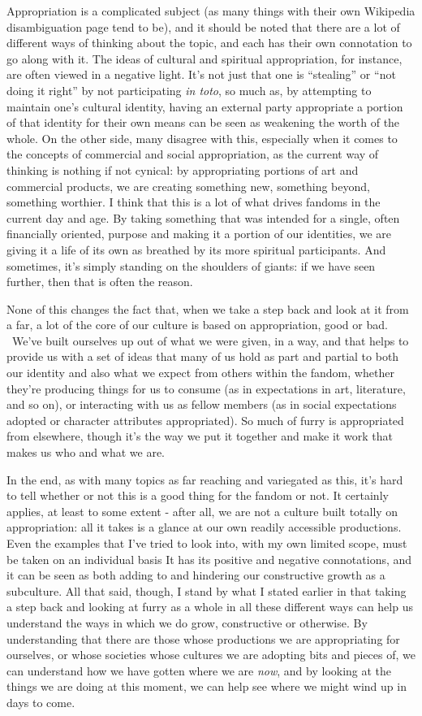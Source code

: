 Appropriation is a complicated subject (as many things with their own
Wikipedia disambiguation page tend to be), and it should be noted that
there are a lot of different ways of thinking about the topic, and each
has their own connotation to go along with it. The ideas of cultural and
spiritual appropriation, for instance, are often viewed in a negative
light. It's not just that one is ``stealing'' or ``not doing it right''
by not participating \emph{in toto}, so much as, by attempting to
maintain one's cultural identity, having an external party appropriate a
portion of that identity for their own means can be seen as weakening
the worth of the whole. On the other side, many disagree with this,
especially when it comes to the concepts of commercial and social
appropriation, as the current way of thinking is nothing if not cynical:
by appropriating portions of art and commercial products, we are
creating something new, something beyond, something worthier. I think
that this is a lot of what drives fandoms in the current day and age. By
taking something that was intended for a single, often financially
oriented, purpose and making it a portion of our identities, we are
giving it a life of its own as breathed by its more spiritual
participants. And sometimes, it's simply standing on the shoulders of
giants: if we have seen further, then that is often the reason.

None of this changes the fact that, when we take a step back and look at
it from a far, a lot of the core of our culture is based on
appropriation, good or bad. ~We've built ourselves up out of what we
were given, in a way, and that helps to provide us with a set of ideas
that many of us hold as part and partial to both our identity and also
what we expect from others within the fandom, whether they're producing
things for us to consume (as in expectations in art, literature, and so
on), or interacting with us as fellow members (as in social expectations
adopted or character attributes appropriated). So much of furry is
appropriated from elsewhere, though it's the way we put it together and
make it work that makes us who and what we are.

In the end, as with many topics as far reaching and variegated as this,
it's hard to tell whether or not this is a good thing for the fandom or
not. It certainly applies, at least to some extent - after all, we are
not a culture built totally on appropriation: all it takes is a glance
at our own readily accessible productions. Even the examples that I've
tried to look into, with my own limited scope, must be taken on an
individual basis It has its positive and negative connotations, and it
can be seen as both adding to and hindering our constructive growth as a
subculture. All that said, though, I stand by what I stated earlier in
that taking a step back and looking at furry as a whole in all these
different ways can help us understand the ways in which we do grow,
constructive or otherwise. By understanding that there are those whose
productions we are appropriating for ourselves, or whose societies whose
cultures we are adopting bits and pieces of, we can understand how we
have gotten where we are \emph{now}, and by looking at the things we are
doing at this moment, we can help see where we might wind up in days to
come.

